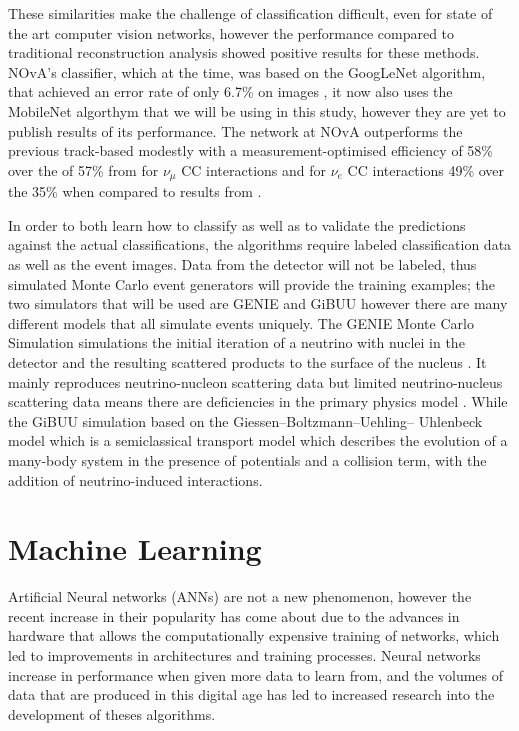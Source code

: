 \noindent These similarities make the challenge of classification difficult, even for state of the art computer vision networks, however the performance compared to traditional reconstruction analysis showed positive results for these methods. NOvA's classifier, which at the time, was based on the GoogLeNet algorithm, that achieved an error rate of only 6.7\% on images \cite{Szegedy}, it now also uses the MobileNet algorthym that we will be using in this study, however they are yet to publish results of its performance. The network at NOvA outperforms the previous track-based modestly with a measurement-optimised efficiency of 58\% over the of 57\% from \cite{Adamson_1} for $\nu_\mu$ CC interactions and for $\nu_e$ CC interactions 49\% over the 35\% when compared to results from \cite{Adamson_2}. \medskip

\noindent In order to both learn how to classify as well as to validate the predictions against the actual classifications, the algorithms require labeled classification data as well as the event images. Data from the detector will not be labeled, thus simulated Monte Carlo event generators will provide the training examples; the two simulators that will be used are GENIE \cite{Andreopoulos_1} and GiBUU \cite{Lalakulich} however there are many different models that all simulate events uniquely. The GENIE Monte Carlo Simulation simulations the initial iteration of a neutrino with nuclei in the detector and the resulting scattered products to the surface of the nucleus \cite{Andreopoulos_2}. It mainly reproduces neutrino-nucleon scattering data but limited neutrino-nucleus scattering data means there are deficiencies in the primary physics model \cite{Perdue}. While the GiBUU simulation based on the Giessen–Boltzmann–Uehling– Uhlenbeck model which is a semiclassical transport model which describes the evolution of a many-body system in the presence of potentials and a collision term, with the addition  of neutrino-induced interactions. \medskip

\section{Machine Learning}

\noindent Artificial Neural networks (ANNs) \cite{McCulloch} are not a new phenomenon, however the recent increase in their popularity has come about due to the advances in hardware that allows the computationally expensive training of networks, which led to improvements in architectures and training processes. Neural networks increase in performance when given more data to learn from, and the volumes of data that are produced in this digital age has led to increased research into the development of theses algorithms. \medskip


